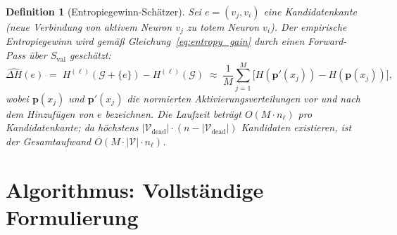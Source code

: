 \documentclass[12pt, a4paper, openany]{report}
\newtheorem{definition}[theorem]{Definition}
\newcommand{\calG}{\mathcal{G}}
\newcommand{\calV}{\mathcal{V}}
\begin{document}
\begin{definition}[Entropiegewinn-Schätzer]
\label{def:entropy_estimator}
Sei $e = (v_j, v_i)$ eine Kandidatenkante (neue Verbindung von aktivem
Neuron $v_j$ zu totem Neuron $v_i$).  Der \emph{empirische Entropiegewinn}
wird gemäß Gleichung~\eqref{eq:entropy_gain} durch einen Forward-Pass
über $S_{\mathrm{val}}$ geschätzt:
\begin{equation}
  \label{eq:entropy_estimator}
  \widehat{\Delta H}(e)
  \;=\;
  H^{(\ell)}(\calG + \{e\}) - H^{(\ell)}(\calG)
  \;\approx\;
  \frac{1}{M}\sum_{j=1}^{M}
  \bigl[H(\bm{p}'(x_j)) - H(\bm{p}(x_j))\bigr],
\end{equation}
wobei $\bm{p}(x_j)$ und $\bm{p}'(x_j)$ die normierten Aktivierungsverteilungen
vor und nach dem Hinzufügen von $e$ bezeichnen.  Die Laufzeit beträgt
$O(M \cdot n_\ell)$ pro Kandidatenkante; da höchstens $|\calV_{\mathrm{dead}}| \cdot
(n - |\calV_{\mathrm{dead}}|)$ Kandidaten existieren, ist der Gesamtaufwand
$O(M \cdot |\calV| \cdot n_\ell)$.
\end{definition}

\section{Algorithmus: Vollständige Formulierung}
\label{sec:algo_full}
\end{document}
